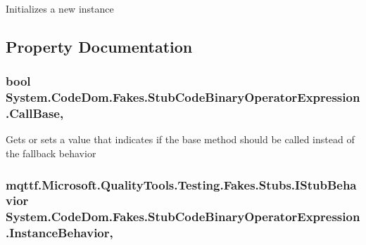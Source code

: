Initializes a new instance



\subsection{Property Documentation}
\hypertarget{class_system_1_1_code_dom_1_1_fakes_1_1_stub_code_binary_operator_expression_aa0449dffccec2f3cdfeb63b41f01658a}{
\subsubsection[{Call\-Base}]{\setlength{\rightskip}{0pt plus 5cm}bool System.\-Code\-Dom.\-Fakes.\-Stub\-Code\-Binary\-Operator\-Expression.\-Call\-Base\hspace{0.3cm}{\ttfamily [get]}, {\ttfamily [set]}}}\label{class_system_1_1_code_dom_1_1_fakes_1_1_stub_code_binary_operator_expression_aa0449dffccec2f3cdfeb63b41f01658a}


Gets or sets a value that indicates if the base method should be called instead of the fallback behavior

\hypertarget{class_system_1_1_code_dom_1_1_fakes_1_1_stub_code_binary_operator_expression_aa9f591157c8189794b8491b890409576}{
\subsubsection[{Instance\-Behavior}]{\setlength{\rightskip}{0pt plus 5cm}mqttf.\-Microsoft.\-Quality\-Tools.\-Testing.\-Fakes.\-Stubs.\-I\-Stub\-Behavior System.\-Code\-Dom.\-Fakes.\-Stub\-Code\-Binary\-Operator\-Expression.\-Instance\-Behavior\hspace{0.3cm}{\ttfamily [get]}, {\ttfamily [set]}}}\label{class_system_1_1_code_dom_1_1_fakes_1_1_stub_code_binary_operator_expression_aa9f591157c8189794b8491b890409576}


